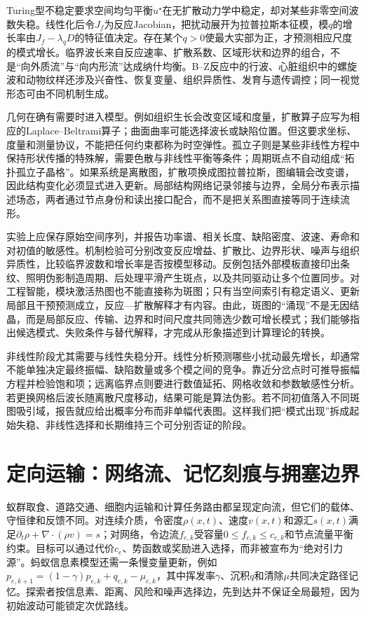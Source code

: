 Turing型不稳定要求空间均匀平衡$u^\star$在无扩散动力学中稳定，却对某些非零空间波数失稳。线性化后令$J_f$为反应Jacobian，把扰动展开为拉普拉斯本征模，模$q$的增长率由$J_f-\lambda_qD$的特征值决定。存在某个$q>0$使最大实部为正，才预测相应尺度的模式增长。临界波长来自反应速率、扩散系数、区域形状和边界的组合，不是“向外质流”与“向内形流”达成纳什均衡。B--Z反应中的行波、心脏组织中的螺旋波和动物纹样还涉及兴奋性、恢复变量、组织异质性、发育与遗传调控；同一视觉形态可由不同机制生成。

几何在确有需要时进入模型。例如组织生长会改变区域和度量，扩散算子应写为相应的Laplace--Beltrami算子；曲面曲率可能选择波长或缺陷位置。但这要求坐标、度量和测量协议，不能把任何约束都称为时空弹性。孤立子则是某些非线性方程中保持形状传播的特殊解，需要色散与非线性平衡等条件；周期斑点不自动组成“拓扑孤立子晶格”。如果系统是离散图，扩散项换成图拉普拉斯，图编辑会改变谱，因此结构变化必须显式进入更新。局部结构网络记录邻接与边界，全局分布表示描述场态，两者通过节点身份和读出接口配合，而不是把关系图直接等同于连续流形。

实验上应保存原始空间序列，并报告功率谱、相关长度、缺陷密度、波速、寿命和对初值的敏感性。机制检验可分别改变反应增益、扩散比、边界形状、噪声与组织异质性，比较临界波数和增长率是否按模型移动。反例包括外部模板直接印出条纹、照明伪影制造周期、后处理平滑产生斑点，以及共同驱动让多个位置同步。对工程智能，模块激活热图也不能直接称为斑图；只有当空间索引有稳定语义、更新局部且干预预测成立，反应—扩散解释才有内容。由此，斑图的“涌现”不是无因结晶，而是局部反应、传输、边界和时间尺度共同筛选少数可增长模式；我们能够指出候选模式、失败条件与替代解释，才完成从形象描述到计算理论的转换。

非线性阶段尤其需要与线性失稳分开。线性分析预测哪些小扰动最先增长，却通常不能单独决定最终振幅、缺陷数量或多个模之间的竞争。靠近分岔点时可推导振幅方程并检验饱和项；远离临界点则要进行数值延拓、网格收敛和参数敏感性分析。若更换网格后波长随离散尺度移动，结果可能是算法伪影。若不同初值落入不同斑图吸引域，报告就应给出概率分布而非单幅代表图。这样我们把“模式出现”拆成起始失稳、非线性选择和长期维持三个可分别否证的阶段。

\section{定向运输：网络流、记忆刻痕与拥塞边界}
\label{sec:emergence_transport}

蚁群取食、道路交通、细胞内运输和计算任务路由都呈现定向流，但它们的载体、守恒律和反馈不同。对连续介质，令密度$\rho(x,t)$、速度$v(x,t)$和源汇$s(x,t)$满足$\partial_t\rho+\nabla\cdot(\rho v)=s$；对网络，令边流$f_{e,k}$受容量$0\leq f_{e,k}\leq c_{e,k}$和节点流量平衡约束。目标可以通过代价$c_e$、势函数或奖励进入选择，而非被宣布为“绝对引力源”。蚂蚁信息素模型还需一条慢变量更新，例如$p_{e,k+1}=(1-\gamma)p_{e,k}+q_{e,k}-\mu_{e,k}$，其中挥发率$\gamma$、沉积$q$和清除$\mu$共同决定路径记忆。探索者按信息素、距离、风险和噪声选择边，先到达并不保证全局最短，因为初始波动可能锁定次优路线。

